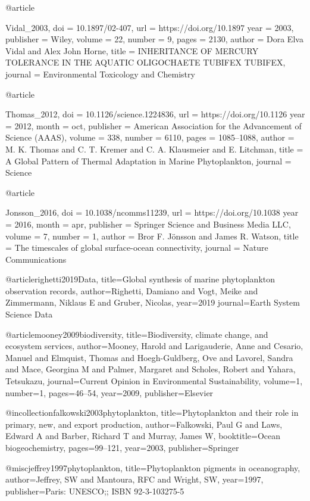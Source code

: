 {{{{{{@article{Vidal_2003,
	doi = {10.1897/02-407},
	url = {https://doi.org/10.1897%
	year = 2003,
	publisher = {Wiley},
	volume = {22},
	number = {9},
	pages = {2130},
	author = {Dora Elva Vidal and Alex John Horne},
	title = {{INHERITANCE} {OF} {MERCURY} {TOLERANCE} {IN} {THE} {AQUATIC} {OLIGOCHAETE} {TUBIFEX} {TUBIFEX}},
	journal = {Environmental Toxicology and Chemistry}
}


@article{Thomas_2012,
	doi = {10.1126/science.1224836},
	url = {https://doi.org/10.1126%
	year = 2012,
	month = {oct},
	publisher = {American Association for the Advancement of Science ({AAAS})},
	volume = {338},
	number = {6110},
	pages = {1085--1088},
	author = {M. K. Thomas and C. T. Kremer and C. A. Klausmeier and E. Litchman},
	title = {A Global Pattern of Thermal Adaptation in Marine Phytoplankton},
	journal = {Science}
}


@article{Jonsson_2016,
	doi = {10.1038/ncomms11239},
	url = {https://doi.org/10.1038%
	year = 2016,
	month = {apr},
	publisher = {Springer Science and Business Media {LLC}},
	volume = {7},
	number = {1},
	author = {Bror F. J\"onsson and James R. Watson},
	title = {The timescales of global surface-ocean connectivity},
	journal = {Nature Communications}
}

@article{righetti2019Data,
	title={Global synthesis of marine phytoplankton observation records},
    author={Righetti, Damiano and Vogt, Meike and Zimmermann, Niklaus E and Gruber, Nicolas},
    year={2019}
    journal={Earth System Science Data}
}


@article{mooney2009biodiversity,
  title={Biodiversity, climate change, and ecosystem services},
  author={Mooney, Harold and Larigauderie, Anne and Cesario, Manuel and Elmquist, Thomas and Hoegh-Guldberg, Ove and Lavorel, Sandra and Mace, Georgina M and Palmer, Margaret and Scholes, Robert and Yahara, Tetsukazu},
  journal={Current Opinion in Environmental Sustainability},
  volume={1},
  number={1},
  pages={46--54},
  year={2009},
  publisher={Elsevier}
}

@incollection{falkowski2003phytoplankton,
  title={Phytoplankton and their role in primary, new, and export production},
  author={Falkowski, Paul G and Laws, Edward A and Barber, Richard T and Murray, James W},
  booktitle={Ocean biogeochemistry},
  pages={99--121},
  year={2003},
  publisher={Springer}
}

@misc{jeffrey1997phytoplankton,
  title={Phytoplankton pigments in oceanography},
  author={Jeffrey, SW and Mantoura, RFC and Wright, SW},
  year={1997},
  publisher={Paris: UNESCO;; ISBN 92-3-103275-5}
}

}}}}}}}}}
